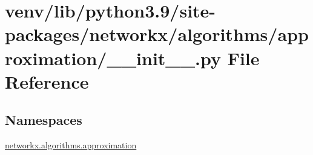 \hypertarget{venv_2lib_2python3_89_2site-packages_2networkx_2algorithms_2approximation_2____init_____8py}{}\section{venv/lib/python3.9/site-\/packages/networkx/algorithms/approximation/\+\_\+\+\_\+init\+\_\+\+\_\+.py File Reference}
\label{venv_2lib_2python3_89_2site-packages_2networkx_2algorithms_2approximation_2____init_____8py}
\subsection*{Namespaces}
\begin{DoxyCompactItemize}
\item 
 \hyperlink{namespacenetworkx_1_1algorithms_1_1approximation}{networkx.\+algorithms.\+approximation}
\end{DoxyCompactItemize}
